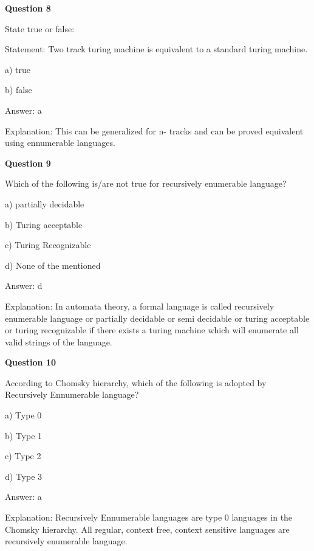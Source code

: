 \documentclass{article}
\begin{document}
\begin{mdframed}[linewidth=1pt, roundcorner=5pt, linecolor=gray!30, backgroundcolor=gray!5]
\textbf{Question 8} 

State true or false:

Statement: Two track turing machine is equivalent to a standard turing machine.

a) true

b) false
\vspace{5pt} \par
\begin{tcolorbox}[colback=green!5, colframe=green!40!black, title=Solution]
Answer: a

Explanation: This can be generalized for n- tracks and can be proved equivalent using ennumerable languages.
\end{tcolorbox}
\end{mdframed}
\newpage

\begin{mdframed}[linewidth=1pt, roundcorner=5pt, linecolor=gray!30, backgroundcolor=gray!5]
\textbf{Question 9} 

Which of the following is/are not true for recursively enumerable language?

a) partially decidable

b) Turing acceptable

c) Turing Recognizable

d) None of the mentioned
\vspace{5pt} \par
\begin{tcolorbox}[colback=green!5, colframe=green!40!black, title=Solution]
Answer: d

Explanation: In automata theory, a formal language is called recursively enumerable language or partially decidable or semi decidable or turing acceptable or turing recognizable if there exists a turing machine which will enumerate all valid strings of the language.
\end{tcolorbox}
\end{mdframed}

\begin{mdframed}[linewidth=1pt, roundcorner=5pt, linecolor=gray!30, backgroundcolor=gray!5]
\textbf{Question 10} 

According to Chomsky hierarchy, which of the following is adopted by Recursively Ennumerable language?

a) Type 0

b) Type 1

c) Type 2

d) Type 3
\vspace{5pt} \par
\begin{tcolorbox}[colback=green!5, colframe=green!40!black, title=Solution]
Answer: a

Explanation: Recursively Ennumerable languages are type 0 languages in the Chomsky hierarchy. All regular, context free, context sensitive languages are recursively enumerable language.
\end{tcolorbox}
\end{mdframed}
\end{document}
